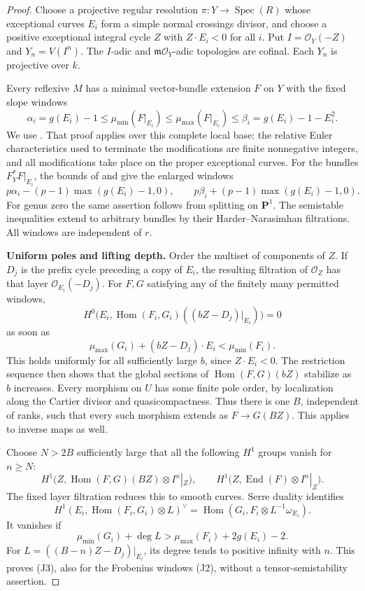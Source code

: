 \begin{proof}
Choose a projective regular resolution
\(\pi:Y\to\operatorname{Spec}(R)\) whose exceptional curves \(E_i\)
form a simple normal crossings divisor, and choose a positive
exceptional integral cycle \(Z\) with \(Z\cdot E_i<0\) for all \(i\).
Put \(I=\mathcal O_Y(-Z)\) and \(Y_n=V(I^n)\).
The \(I\)-adic and \(\mathfrak m\mathcal O_Y\)-adic topologies are
cofinal. Each \(Y_n\) is projective over \(k\).

Every reflexive \(M\) has a minimal vector-bundle extension \(F\)
on \(Y\) with the fixed slope windows
\[
 \alpha_i=g(E_i)-1\leq\mu_{\min}(F|_{E_i})
 \leq\mu_{\max}(F|_{E_i})
 \leq\beta_i=g(E_i)-1-E_i^2.
 \tag{J1}
\]
We use \cite[Definition 1.2 and Lemma 1.3, including the
elementary-transformation proof]{C_Langer2026}.
That proof applies over this complete local base: the relative
Euler characteristics used to terminate the modifications are
finite nonnegative integers, and all modifications take place
on the proper exceptional curves.
For the bundles \(F_Y^*F|_{E_i}\), the bounds of
\cite[Theorem 2.2]{C_Sun2008} and
\cite[Proposition 1.3 and its proof]{C_MehtaPauly2007} give the
enlarged windows
\[
 p\alpha_i-(p-1)\max(g(E_i)-1,0),\qquad
 p\beta_i+(p-1)\max(g(E_i)-1,0).
 \tag{J2}
\]
For genus zero the same assertion follows from splitting on
\(\mathbf P^1\). The semistable inequalities extend to arbitrary
bundles by their Harder--Narasimhan filtrations. All windows are
independent of \(r\).

\par\smallskip\noindent\textbf{Uniform poles and lifting depth.}\quad
Order the multiset of components of \(Z\).
If \(D_j\) is the prefix cycle preceding a copy of \(E_i\), the
resulting filtration of \(\mathcal O_Z\) has that layer
\(\mathcal O_{E_i}(-D_j)\).
For \(F,G\) satisfying any of the finitely many permitted windows,
\[
 H^0\bigl(E_i,\operatorname{Hom}(F_i,G_i)
                ((bZ-D_j)|_{E_i})\bigr)=0
\]
as soon as
\[
 \mu_{\max}(G_i)+(bZ-D_j)\cdot E_i<\mu_{\min}(F_i).
\]
This holds uniformly for all sufficiently large \(b\), since
\(Z\cdot E_i<0\).
The restriction sequence then shows that the global sections of
\(\operatorname{Hom}(F,G)(bZ)\) stabilize as \(b\) increases.
Every morphism on \(U\) has some finite pole order, by localization
along the Cartier divisor and quasicompactness. Thus there is one
\(B\), independent of ranks, such that every such morphism
extends as \(F\to G(BZ)\). This applies to inverse maps as well.

Choose \(N>2B\) sufficiently large that all the following \(H^1\)
groups vanish for \(n\geq N\):
\[
 H^1\bigl(Z,\operatorname{Hom}(F,G)(BZ)\otimes I^n|_Z\bigr),
 \qquad
 H^1\bigl(Z,\operatorname{End}(F)\otimes I^n|_Z\bigr).
 \tag{J3}
\]
The fixed layer filtration reduces this to smooth curves.
Serre duality identifies
\[
 H^1(E_i,\operatorname{Hom}(F_i,G_i)\otimes L)^\vee
     =\operatorname{Hom}(G_i,F_i\otimes L^{-1}\omega_{E_i}).
\]
It vanishes if
\[
 \mu_{\min}(G_i)+\deg L>
          \mu_{\max}(F_i)+2g(E_i)-2.
\]
For \(L=((B-n)Z-D_j)|_{E_i}\), its degree tends to positive
infinity with \(n\). This proves (J3), also for the Frobenius
windows (J2), without a tensor-semistability assertion.


\end{proof}
